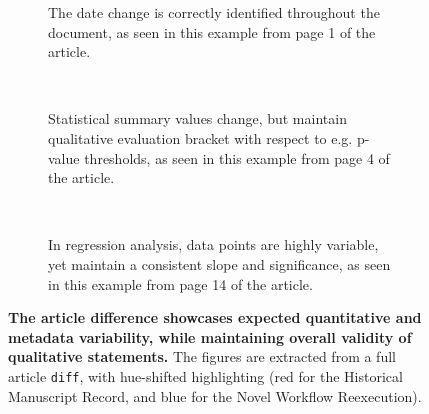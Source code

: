 \begin{figure}
	\centering
	\begin{subfigure}{0.99\textwidth}
		\centering
		\caption{
			The date change is correctly identified throughout the document, as seen in this example from page 1 of the article.
		}
		\label{fig:diff_date}
	\end{subfigure}
	\\
	\begin{subfigure}{0.99\textwidth}
		\centering
		\caption{
			Statistical summary values change, but maintain qualitative evaluation bracket with respect to e.g. p-value thresholds, as seen in this example from page 4 of the article.
		}
		\label{fig:diff_text}
	\end{subfigure}
	\\
	\vspace{1em}
	\begin{subfigure}{0.99\textwidth}
		\centering
		\caption{
			In regression analysis, data points are highly variable, yet maintain a consistent slope and significance, as seen in this example from page 14 of the article.
		}
		\label{fig:diff_fig}
	\end{subfigure}
	\caption{
		\textbf{The article difference showcases expected quantitative and metadata variability, while maintaining overall validity of qualitative statements.}
		The figures are extracted from a full article \texttt{diff}, with hue-shifted highlighting (red for the Historical Manuscript Record, and blue for the Novel Workflow Reexecution).
	}
	\label{fig:diff}
\end{figure}


